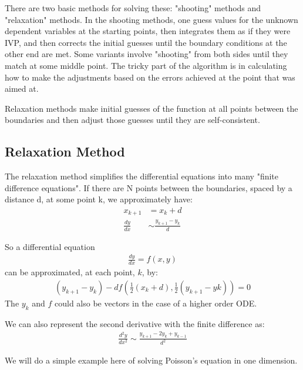 There are two basic methods for solving these: "shooting" methods and "relaxation" methods. In the shooting methods, one guess values for the unknown dependent variables at the starting points, then integrates them as if they were IVP, and then corrects the initial guesses until the boundary conditions at the other end are met. Some variants involve "shooting" from both sides until they match at some middle point. The tricky part of the algorithm is in calculating how to make the adjustments based on the errors achieved at the point that was aimed at.

Relaxation methods make initial guesses of the function at all points between the boundaries and then adjust those guesses until they are self-consistent.

\subsection{Relaxation Method}
The relaxation method simplifies the differential equations into many "finite difference equations". If there are N points between the boundaries, spaced by a distance d, at some point k, we approximately have:
\begin{align}
 x_{k+1}&=x_{k}+d \nonumber\\
 \frac{dy}{dx} &\sim \frac{y_{k+1}-y_k}{d} 
\end{align}

So a differential equation 
\begin{align}
\frac{dy}{dx} = f(x,y) 
\end{align}
can be approximated, at each point, $k$, by:
\begin{align}
 (y_{k+1}-y_k) - df(\frac{1}{2}(x_k+d),\frac{1}{2}(y_{k+1}-y{k})) =0 
\end{align}
The $y_k$ and $f$ could also be vectors in the case of a higher order ODE. 

We can also represent the second derivative with the finite difference as:
\begin{align}
 \frac{d^2y}{dx^2} \sim \frac{y_{k+1}-2y_k+y_{k-1}}{d^2} 
\end{align}

We will do a simple example here of solving Poisson's equation in one dimension.

